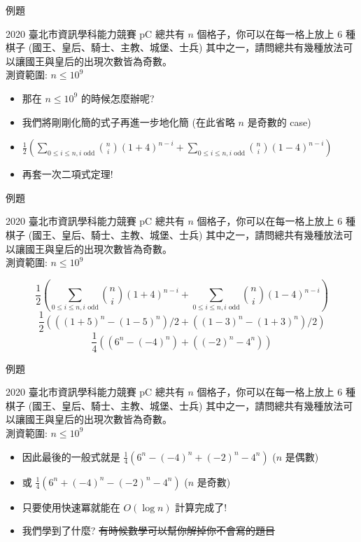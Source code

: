 \documentclass[aspectratio=169]{beamer}
\begin{document}
\begin{frame}{例題}
    \begin{block}{2020 臺北市資訊學科能力競賽 pC}
        總共有 $n$ 個格子，你可以在每一格上放上 $6$ 種棋子 (國王、皇后、騎士、主教、城堡、士兵) 其中之一，請問總共有幾種放法可以讓國王與皇后的出現次數皆為奇數。\\
        \vspace{5mm}
        測資範圍: $n \le 10^9$
    \end{block} 
    \begin{itemize}
        \item<1-> 那在 $n \le 10^9$ 的時候怎麼辦呢?
        \item<2-> 我們將剛剛化簡的式子再進一步地化簡 (在此省略 $n$ 是奇數的 case)
        \item<3-> $\displaystyle \frac{1}{2}(\sum_{0 \le i \le n, i \text{ odd}} \binom{n}{i} (1+4)^{n-i} + \sum_{0 \le i \le n, i \text{ odd}} \binom{n}{i} (1-4)^{n-i})$
        \item<4-> 再套一次二項式定理!
    \end{itemize}
\end{frame}

\begin{frame}{例題}
    \begin{block}{2020 臺北市資訊學科能力競賽 pC}
        總共有 $n$ 個格子，你可以在每一格上放上 $6$ 種棋子 (國王、皇后、騎士、主教、城堡、士兵) 其中之一，請問總共有幾種放法可以讓國王與皇后的出現次數皆為奇數。\\
        \vspace{5mm}
        測資範圍: $n \le 10^9$
    \end{block} 
    $$\displaystyle \frac{1}{2}(\sum_{0 \le i \le n, i \text{ odd}} \binom{n}{i} (1+4)^{n-i} + \sum_{0 \le i \le n, i \text{ odd}} \binom{n}{i} (1-4)^{n-i})$$
    $$\displaystyle \frac{1}{2} (((1+5)^n - (1-5)^n)/2 + ((1-3)^n - (1+3)^n)/2)$$
    $$\displaystyle \frac{1}{4} ((6^n - (-4)^n) + ((-2)^n - 4^n))$$
\end{frame}


\begin{frame}{例題}
    \begin{block}{2020 臺北市資訊學科能力競賽 pC}
        總共有 $n$ 個格子，你可以在每一格上放上 $6$ 種棋子 (國王、皇后、騎士、主教、城堡、士兵) 其中之一，請問總共有幾種放法可以讓國王與皇后的出現次數皆為奇數。\\
        \vspace{5mm}
        測資範圍: $n \le 10^9$
    \end{block} 
    \begin{itemize}
        \item<1-> 因此最後的一般式就是 $\displaystyle \frac{1}{4} (6^n - (-4)^n + (-2)^n - 4^n)$ ($n$ 是偶數)
        \item<1-> 或 $\displaystyle \frac{1}{4} (6^n + (-4)^n - (-2)^n - 4^n)$ ($n$ 是奇數)
        \item<1-> 只要使用快速冪就能在 $O(\log n)$ 計算完成了!
        \item<2-> 我們學到了什麼? \sout{有時候數學可以幫你解掉你不會寫的題目}
    \end{itemize}
\end{frame}
\end{document}
